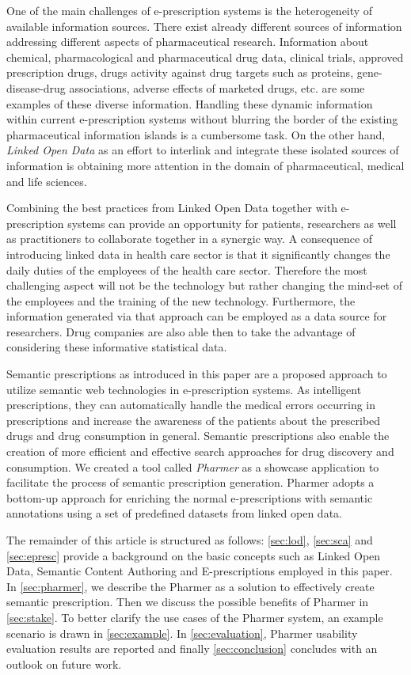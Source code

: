 \documentclass[10pt, conference, compsocconf]{IEEEtran}
\begin{document}
One of the main challenges of e-prescription systems is the heterogeneity of available information sources.
There exist already different sources of information addressing different aspects of pharmaceutical research.
Information about chemical, pharmacological and pharmaceutical drug data, clinical trials, approved prescription drugs, drugs activity against drug targets such as proteins, gene-disease-drug associations, adverse effects of marketed drugs, etc. are some examples of these diverse information.
Handling these dynamic information within current e-prescription systems without blurring the border of the existing pharmaceutical information islands is a cumbersome task.
On the other hand, \emph{Linked Open Data} as an effort to interlink and integrate these isolated sources of information is obtaining more attention in the domain of pharmaceutical, medical and life sciences.

Combining the best practices from Linked Open Data together with e-prescription systems can provide an opportunity for patients, researchers as well as practitioners to collaborate together in a synergic way.
A consequence of introducing linked data in health care sector is that it significantly changes the daily duties of the employees of the health care sector.
Therefore the most challenging aspect will not be the technology but rather changing the mind-set of the employees and the training of the new technology\cite{challengesEP}.
Furthermore, the information generated via that approach can be employed as a data source for researchers.
Drug companies are also able then to take the advantage of considering these informative statistical data.

Semantic prescriptions as introduced in this paper are a proposed approach to utilize semantic web technologies in e-prescription systems.
As intelligent prescriptions, they can automatically handle the medical errors occurring in prescriptions and increase the awareness of the patients about the prescribed drugs and drug consumption in general.
Semantic prescriptions also enable the creation of more efficient and effective search approaches for drug discovery and consumption.
We created a tool called \emph{Pharmer} as a showcase application to facilitate the process of semantic prescription generation.
Pharmer adopts a bottom-up approach for enriching the normal e-prescriptions with semantic annotations using a set of predefined datasets from linked open data.

The remainder of this article is structured as follows:
\autoref{sec:lod}, \autoref{sec:sca} and \autoref{sec:epresc} provide a background on the basic concepts such as Linked Open Data, Semantic Content Authoring and E-prescriptions employed in this paper.
In \autoref{sec:pharmer}, we describe the Pharmer as a solution to effectively create semantic prescription.
Then we discuss the possible benefits of Pharmer in \autoref{sec:stake}.
To better clarify the use cases of the Pharmer system, an example scenario is drawn in \autoref{sec:example}.
In \autoref{sec:evaluation}, Pharmer usability evaluation results are reported and finally \autoref{sec:conclusion} concludes with an outlook on future work.
\end{document}
